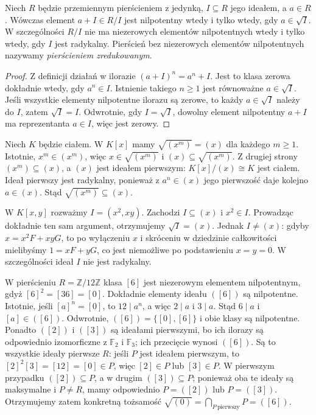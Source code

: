 \begin{stwierdzenie}
\label{aa:st:nilradical-reduced}
Niech $R$ będzie przemiennym pierścieniem z jedynką,
$I\subseteq R$ jego ideałem, a $a\in R$. Wówczas element
$a+I\in R/I$ jest nilpotentny wtedy i tylko wtedy,
gdy $a\in\sqrt I$. W szczególności
$R/I$ nie ma niezerowych elementów nilpotentnych wtedy
i tylko wtedy, gdy $I$ jest radykalny.
Pierścień bez niezerowych elementów nilpotentnych
nazywamy \emph{pierścieniem zredukowanym}.
\end{stwierdzenie}
\begin{proof}
Z definicji działań w ilorazie
$(a+I)^n=a^n+I$. Jest to klasa zerowa dokładnie wtedy,
gdy $a^n\in I$. Istnienie takiego $n\ge1$ jest
równoważne $a\in\sqrt I$. Jeśli wszystkie elementy
nilpotentne ilorazu są zerowe, to każdy $a\in\sqrt I$
należy do $I$, zatem $\sqrt I=I$. Odwrotnie,
gdy $I=\sqrt I$, dowolny element nilpotentny
$a+I$ ma reprezentanta $a\in I$, więc jest zerowy.
\end{proof}

\begin{przyklad}
\label{aa:prz:radical-examples}
Niech $K$ będzie ciałem. W $K[x]$ mamy
$\sqrt{(x^m)}=(x)$ dla każdego $m\ge1$.
Istotnie, $x^m\in(x^m)$, więc $x\in\sqrt{(x^m)}$
i $(x)\subseteq\sqrt{(x^m)}$.
Z drugiej strony $(x^m)\subseteq(x)$, a $(x)$ jest
ideałem pierwszym: $K[x]/(x)\cong K$ jest ciałem.
Ideał pierwszy jest radykalny, ponieważ
z $a^n\in(x)$ jego pierwszość daje kolejno $a\in(x)$.
Stąd $\sqrt{(x^m)}\subseteq(x)$.

W $K[x,y]$ rozważmy $I=(x^2,xy)$. Zachodzi
$I\subseteq(x)$ i $x^2\in I$. Prowadząc dokładnie ten
sam argument, otrzymujemy $\sqrt I=(x)$.
Jednak $I\ne(x)$: gdyby $x=x^2F+xyG$, to
po wyłączeniu $x$ i skróceniu w dziedzinie całkowitości
mielibyśmy $1=xF+yG$, co jest niemożliwe po
podstawieniu $x=y=0$. W szczególności ideał $I$
nie jest radykalny.
\end{przyklad}

\begin{przyklad}
\label{aa:prz:nilradical-z12}
W pierścieniu $R=\mathbb Z/12\mathbb Z$ klasa $[6]$
jest niezerowym elementem nilpotentnym, gdyż
$[6]^2=[36]=[0]$. Dokładnie elementy ideału $([6])$
są nilpotentne. Istotnie, jeśli $[a]^n=[0]$, to
$12\mid a^n$, a więc $2\mid a$ i $3\mid a$.
Stąd $6\mid a$ i $[a]\in([6])$. Odwrotnie,
$([6])=\{[0],[6]\}$ i obie klasy są nilpotentne.
Ponadto $([2])$ i $([3])$ są ideałami pierwszymi,
bo ich ilorazy są odpowiednio izomorficzne z
$\mathbb F_2$ i $\mathbb F_3$; ich przecięcie wynosi
$([6])$. Są to wszystkie ideały pierwsze $R$:
jeśli $P$ jest ideałem pierwszym, to
$[2]^2[3]=[12]=[0]\in P$, więc $[2]\in P$
lub $[3]\in P$. W pierwszym przypadku
$([2])\subseteq P$, a w drugim $([3])\subseteq P$;
ponieważ oba te ideały są maksymalne i $P\ne R$,
mamy odpowiednio $P=([2])$ lub $P=([3])$.
Otrzymujemy zatem konkretną tożsamość
$\sqrt{(0)}=\bigcap_{P\ \mathrm{pierwszy}}P=([6])$.
\end{przyklad}

